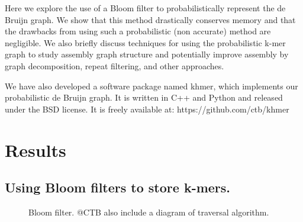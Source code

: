 \documentclass[12pt]{article} \usepackage{simplemargins}
\begin{document}
Here we explore the use of a Bloom filter to probabilistically
represent the de Bruijn graph. We show that this method drastically
conserves memory and that the drawbacks from using such a
probabilistic (non accurate) method are negligible.  We also briefly
discuss techniques for using the probabilistic k-mer graph to study 
assembly graph structure and potentially improve assembly by 
graph decomposition, repeat filtering, and other approaches.

We have also developed a software package named khmer, which
implements our probabilistic de Bruijn graph.  It is written in C++
and Python and released under the BSD license. It is freely available
at: https://github.com/ctb/khmer

\section{Results}

\subsection{Using Bloom filters to store k-mers.}


\begin{figure}
\caption{Bloom filter.  @CTB also include a diagram of traversal algorithm.}
\end{figure}
\end{document}
